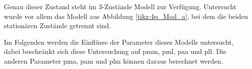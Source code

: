 Genau dieser Zustand steht im 3-Zustände Modell zur Verfügung. Untersucht wurde vor allem das Modell aus Abbildung \ref{tikz:4p_Mod_a}, bei dem die beiden stationären Zustände getrennt sind.

Im Folgenden werden die Einflüsse der Parameter dieses Modells untersucht, dabei beschränkt sich diese Untersuchung auf pmm, pml, paa und pll. Die anderen Parameter pma, pam und plm können daraus berechnet werden.


% 
% 
